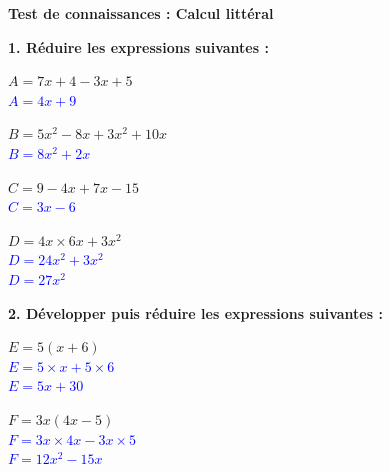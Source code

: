 \documentclass[a4paper]{book}
\begin{document}
{\newpage


\setcounter{exo}{0}

    \begin{exercice}
        \textbf{Test de connaissances : Calcul littéral}
        
        \medskip
        \textbf{1. Réduire les expressions suivantes :}
        
        \noindent
        \begin{minipage}{0.48\textwidth}
            $A = 7x + 4 - 3x + 5$\\
            \textcolor{blue}{$A = 4x + 9$}
            \vspace{0.5cm}
        \end{minipage}\hfill
        \begin{minipage}{0.48\textwidth}
            $B = 5x^2 - 8x + 3x^2 + 10x$\\
            \textcolor{blue}{$B = 8x^2 + 2x$}
            \vspace{0.5cm}
        \end{minipage}
        
        \noindent
        \begin{minipage}{0.48\textwidth}
            $C = 9 - 4x + 7x - 15$\\
            \textcolor{blue}{$C = 3x - 6$}
            \vspace{0.5cm}
        \end{minipage}\hfill
        \begin{minipage}{0.48\textwidth}
            $D = 4x \times 6x + 3x^2$\\
            \textcolor{blue}{$D = 24x^2 + 3x^2$}\\
            \textcolor{blue}{$D = 27x^2$}
            \vspace{0.5cm}
        \end{minipage}
    
        \medskip
        \textbf{2. Développer puis réduire les expressions suivantes :}
        
        \noindent
        \begin{minipage}{0.48\textwidth}
            $E = 5(x + 6)$\\
            \textcolor{blue}{$E = 5 \times x + 5 \times 6$}\\
            \textcolor{blue}{$E = 5x + 30$}
            \vspace{0.5cm}
        \end{minipage}\hfill
        \begin{minipage}{0.48\textwidth}
            $F = 3x(4x - 5)$\\
            \textcolor{blue}{$F = 3x \times 4x - 3x \times 5$}\\
            \textcolor{blue}{$F = 12x^2 - 15x$}
            \vspace{0.5cm}
        \end{minipage}
        

\end{exercice}}
\end{document}
